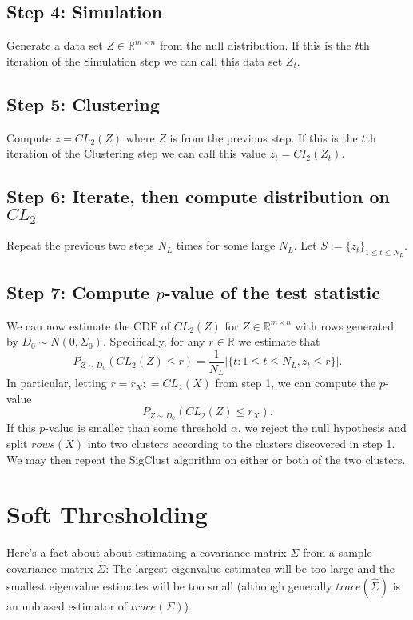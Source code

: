 \documentclass{article}
\begin{document}
\subsection{Step 4: Simulation}
 Generate a data set $Z\in \mathbb{R}^{m \times n}$ from the null distribution.  If this is the $t$th iteration of the Simulation step we can call this data set $Z_t$.
 
\subsection{Step 5: Clustering}  Compute $z = CL_{2}(Z)$ where $Z$ is from the previous step.  If this is the $t$th iteration of the Clustering step we can call this value $z_t = CI_{2}(Z_t)$.

\subsection{Step 6: Iterate, then compute distribution on $CL_{2}$}  
Repeat the previous two steps $N_{L}$ times for some large $N_{L}$.  Let $S:=\{z_{t}\}_{1\leq t\leq N_{L}}.$\\
\subsection{Step 7:  Compute $p$-value of the test statistic}
\indent We can now estimate the CDF of $CL_{2}(Z)$ for $Z\in \mathbb{R}^{m \times n}$ with rows generated by $D_{0} \sim N(0, \Sigma_0)$.  Specifically, for any $r\in \mathbb{R}$ we estimate that
$$P_{Z\sim D_{0}}(CL_{2}(Z) \leq r) = \frac{1}{N_{L}} \lvert \{ t: 1 \leq t \leq N_{L}, z_t \leq r \} \vert.$$
In particular, letting $r=r_X: = CL_{2}(X)$ from step 1, we can compute the $p$-value $$P_{Z\sim D_{0}}(CL_{2}(Z) \leq r_{X}).$$
If this $p$-value is smaller than some threshold $\alpha$, we reject the null hypothesis and split  $rows(X)$ into two clusters according to the clusters discovered in step 1.   We may then repeat the SigClust algorithm on either or both of the two clusters.


\section{Soft Thresholding}
Here's a fact about about estimating a covariance matrix $\Sigma$ from a sample covariance matrix $\hat{\Sigma}$:  The largest eigenvalue estimates will be too large and the smallest eigenvalue estimates will be too small (although generally $trace(\hat{\Sigma})$ is an unbiased estimator of  $trace(\Sigma)$).
\end{document}
